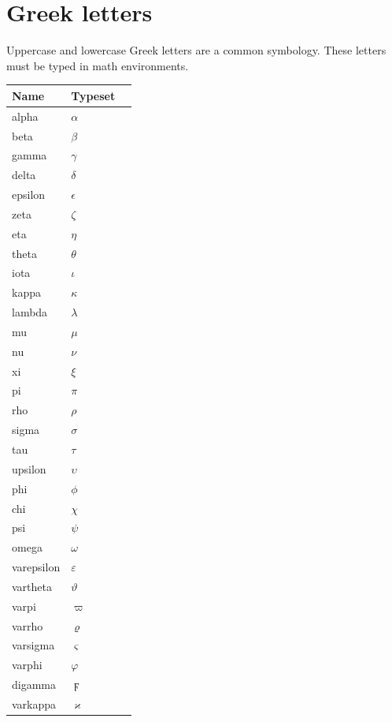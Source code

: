 \documentclass{sample}
\begin{document}
\section{Greek letters}
Uppercase and lowercase Greek letters are a common symbology. These letters must be typed in math environments.

\begin{center}
	\begin{tabular}{llc}
	\toprule
	Name & Typeset \\
	\midrule
	alpha & $\alpha$\\
	beta & $\beta$\\
	gamma & $\gamma$\\
	delta & $\delta$\\
	epsilon & $\epsilon$\\
	zeta & $\zeta$\\
	eta & $\eta$\\
	theta & $\theta$\\
	iota & $\iota$\\
	kappa & $\kappa$\\
	lambda & $\lambda$\\
	mu & $\mu$\\
	nu & $\nu$\\
	xi & $\xi$\\
	pi & $\pi$\\
	rho & $\rho$\\
	sigma & $\sigma$\\
	tau & $\tau$\\
	upsilon & $\upsilon$\\
	phi & $\phi$\\
	chi & $\chi$\\
	psi & $\psi$\\
	omega & $\omega$\\
	varepsilon & $\varepsilon$\\
	vartheta & $\vartheta$\\
	varpi & $\varpi$\\
	varrho & $\varrho$\\
	varsigma & $\varsigma$\\
	varphi & $\varphi$\\
	digamma & $\digamma$\\
	varkappa & $\varkappa$\\
	\bottomrule
	\end{tabular}
	\label{Ta:lowgreek}
\end{center}
\end{document}
